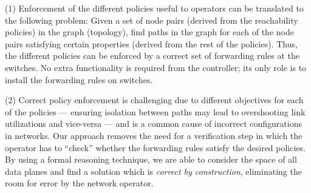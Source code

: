 (1)
Enforcement of the different policies useful to operators 
can be translated to 
the following problem: Given a set of node pairs 
(derived from the reachability policies) in the graph 
(topology), find paths in the graph for each
of the node pairs satisfying certain properties (derived
from the rest of the policies). 
Thus, the different policies can be enforced by 
a correct set of forwarding rules at the switches. 
No extra functionality is required from the controller;
its only role is to install the forwarding rules on switches.



(2) Correct policy enforcement is challenging due to different
objectives for each of the policies --- ensuring isolation between
paths may lead to overshooting link utilizations and vice-versa ---
and is a common cause of incorrect configurations in networks.  Our
approach removes the need for a verification step in which the
operator has to ``check'' whether the forwarding rules satisfy the
desired policies.  By using a formal reasoning technique, we are able
to consider the space of all data planes and find a solution which is
\emph{correct by construction}, eliminating the room for error by the
network operator.

